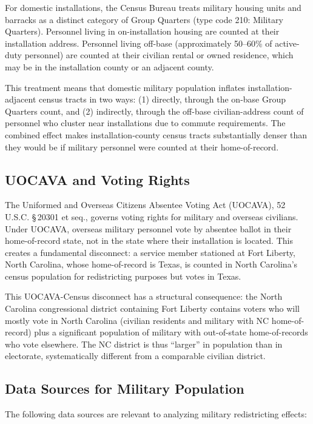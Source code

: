 For domestic installations, the Census Bureau treats military housing units and barracks as a distinct category of Group Quarters (type code 210: Military Quarters). Personnel living in on-installation housing are counted at their installation address. Personnel living off-base (approximately 50--60\% of active-duty personnel) are counted at their civilian rental or owned residence, which may be in the installation county or an adjacent county.

This treatment means that domestic military population inflates installation-adjacent census tracts in two ways: (1) directly, through the on-base Group Quarters count, and (2) indirectly, through the off-base civilian-address count of personnel who cluster near installations due to commute requirements. The combined effect makes installation-county census tracts substantially denser than they would be if military personnel were counted at their home-of-record.

\subsection{UOCAVA and Voting Rights}

The Uniformed and Overseas Citizens Absentee Voting Act (UOCAVA), 52 U.S.C. \S\,20301 et seq., governs voting rights for military and overseas civilians. Under UOCAVA, overseas military personnel vote by absentee ballot in their home-of-record state, not in the state where their installation is located. This creates a fundamental disconnect: a service member stationed at Fort Liberty, North Carolina, whose home-of-record is Texas, is counted in North Carolina's census population for redistricting purposes but votes in Texas.

This UOCAVA-Census disconnect has a structural consequence: the North Carolina congressional district containing Fort Liberty contains voters who will mostly vote in North Carolina (civilian residents and military with NC home-of-record) plus a significant population of military with out-of-state home-of-records who vote elsewhere. The NC district is thus ``larger'' in population than in electorate, systematically different from a comparable civilian district.

\subsection{Data Sources for Military Population}

The following data sources are relevant to analyzing military redistricting effects:


